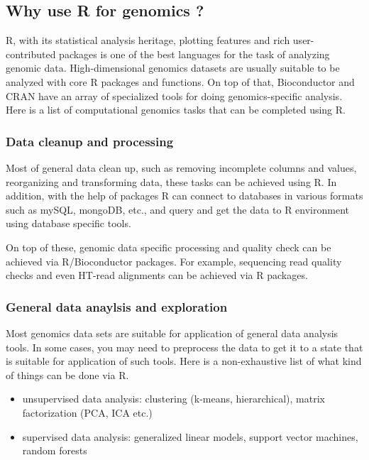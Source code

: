 \documentclass[12pt,]{krantz}
\providecommand{\tightlist}{%
  \setlength{\itemsep}{0pt}\setlength{\parskip}{0pt}}
\begin{document}
\hypertarget{why-use-r-for-genomics}{%
\subsection{Why use R for genomics ?}\label{why-use-r-for-genomics}}

R, with its statistical analysis
heritage, plotting features and rich user-contributed packages is one of the
best languages for the task of analyzing genomic data.
High-dimensional genomics datasets are usually suitable to
be analyzed with core R packages and functions. On top of that, Bioconductor and CRAN have an
array of specialized tools for doing genomics-specific analysis. Here is a list of computational genomics tasks that can be completed using R.

\hypertarget{data-cleanup-and-processing}{%
\subsubsection{Data cleanup and processing}\label{data-cleanup-and-processing}}

Most of general data clean up, such as removing incomplete columns and values, reorganizing and transforming data, these tasks can be achieved using R. In addition, with the help of packages R can connect to databases in various formats such as mySQL, mongoDB, etc., and query and get the data to R environment using database specific tools.

On top of these, genomic data specific processing and quality check can be achieved via R/Bioconductor packages. For example, sequencing read quality checks and even HT-read alignments can be achieved via R packages.

\hypertarget{general-data-anaylsis-and-exploration}{%
\subsubsection{General data anaylsis and exploration}\label{general-data-anaylsis-and-exploration}}

Most genomics data sets are suitable for application of general data analysis tools. In some cases, you may need to preprocess the data to get it to a state that is suitable for application of such tools. Here is a non-exhaustive list of what kind of things can be done via R.

\begin{itemize}
\tightlist
\item
  unsupervised data analysis: clustering (k-means, hierarchical), matrix factorization
  (PCA, ICA etc.)
\item
  supervised data analysis: generalized linear models, support vector machines, random forests
\end{itemize}
\end{document}
